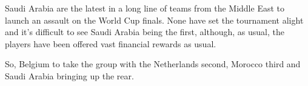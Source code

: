 Saudi Arabia are the latest in a long line of teams from the Middle East to 
launch an assault on the World Cup finals. None have set the tournament alight
and it's difficult to see Saudi Arabia being the first, although, as usual, 
the players have been offered vast financial rewards as usual.

So, Belgium to take the group with the Netherlands second, Morocco third and 
Saudi Arabia bringing up the rear.
